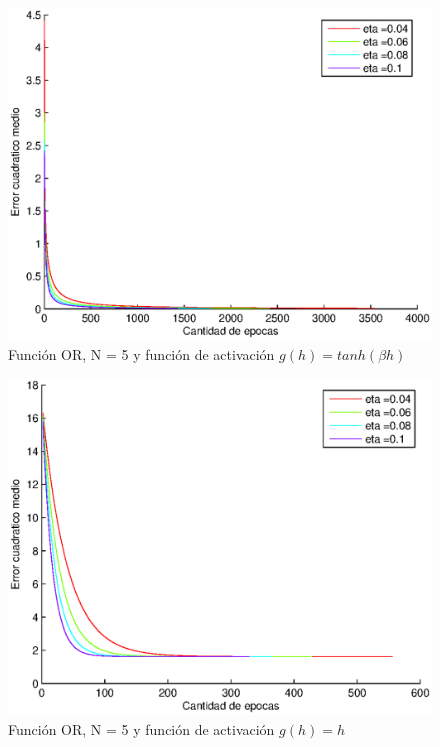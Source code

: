\documentclass{sig-alternate}
\begin{document}
\begin{figure}[!ht]
	\includegraphics[scale=0.5]{images/PuriOr/OR_N5_err001_tanh.eps}
  \caption{Funci\'on OR, N = 5 y funci\'on de activaci\'on $g(h) = tanh(\beta h)$}
  \label{fig:tanh}
\end{figure}

\begin{figure}[!ht]
	\includegraphics[scale=0.5]{images/PuriOr/OR_N5_err001_lineal__error.eps}
  \caption{Funci\'on OR, N = 5 y funci\'on de activaci\'on $g(h) = h$}
  \label{fig:lineal}
\end{figure}
\end{document}
